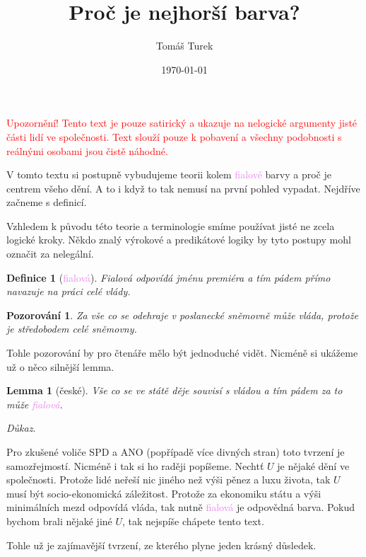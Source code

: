 \documentclass[12pt, a4paper]{article}
\title{Proč je \fialova{á} nejhorší barva?}
\author{Tomáš Turek}
\date{\today}
\theoremstyle{plain}
\newtheorem{lemma}[veta]{Lemma}
\theoremstyle{plain}
\newtheorem{definice}{Definice}
\newtheorem*{pozor}{Pozorování}
\theoremstyle{remark}
\newenvironment{dukaz}{
	\par\medskip\noindent
	\textit{Důkaz}.
}{
	\newline
	\rightline{$\qedsymbol$}
}
\newcommand{\fialova}[1]{\textcolor{violet}{fialov#1}}
\begin{document}
	\maketitle
	
	\begin{center}
		{\small \textcolor{red}{Upozornění! Tento text je pouze satirický a ukazuje na nelogické argumenty jisté části lidí ve společnosti. Text slouží pouze k pobavení a všechny podobnosti s reálnými osobami jsou čistě náhodné.}}
	\end{center}
	
	V tomto textu si postupně vybudujeme teorii kolem \fialova{é} barvy a proč je centrem všeho dění. A to i když to tak nemusí na první pohled vypadat. Nejdříve začneme s definicí.
	
	Vzhledem k původu této teorie a terminologie smíme používat jisté ne zcela logické kroky. Někdo znalý výrokové a predikátové logiky by tyto postupy mohl označit za nelegální.
	
	\begin{definice}[\fialova{á}]
		Fialová odpovídá jménu premiéra a tím pádem přímo navazuje na práci celé vlády.
	\end{definice}
	
	\begin{pozor}
		Za vše co se odehraje v poslanecké sněmovně může vláda, protože je středobodem celé sněmovny.
	\end{pozor}
	
	Tohle pozorování by pro čtenáře mělo být jednoduché vidět. Nicméně si ukážeme už o něco silnější lemma.
	
	\begin{lemma}[české]
		Vše co se ve státě děje souvisí s vládou a tím pádem za to může \fialova{á}.
	\end{lemma}
	
	\begin{dukaz}
		Pro zkušené voliče SPD a ANO (popřípadě více divných stran) toto tvrzení je samozřejmostí. Nicméně i tak si ho raději popíšeme. Nechtť $U$ je nějaké dění ve společnosti. Protože lidé neřeší nic jiného než výši pěnez a luxu života, tak $U$ musí být socio-ekonomická záležitost. Protože za ekonomiku státu a výši minimálních mezd odpovídá vláda, tak nutně \fialova{á} je odpovědná barva. Pokud bychom brali nějaké jiné $U$, tak nejspíše chápete tento text.
	\end{dukaz}
	
	Tohle už je zajímavější tvrzení, ze kterého plyne jeden krásný důsledek.
	
\end{document}
